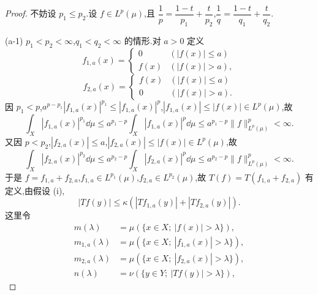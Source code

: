 \begin{proof}
不妨设 $p_{1} \leq p_{2}$.设 $f \in L^{p}(\mu)$,且 $\dfrac{1}{p} = \dfrac{1 - t}{p_{1}} + \dfrac{t}{p_{2}}$,$\dfrac{1}{q} = \dfrac{1 - t}{q_{1}} + \dfrac{t}{q_{2}}$.

(a-1) $p_{1} < p_{2} < \infty$,$q_{1} < q_{2} < \infty$ 的情形.对 $a > 0$ 定义
\begin{equation*}
f_{1,a}(x) = \begin{cases} 0 & (|f(x)| \leq a) \\ f(x) & (|f(x)| > a), \end{cases}
\end{equation*}
\begin{equation*}
f_{2,a}(x) = \begin{cases} f(x) & (|f(x)| \leq a) \\ 0 & (|f(x)| > a). \end{cases}
\end{equation*}
因 $p_{1} < p$,$a^{p-p_{1}}|f_{1,a}(x)|^{p_{1}} \leq |f_{1,a}(x)|^{p}$,$|f_{1,a}(x)| \leq |f(x)| \in L^{p}(\mu)$,故
\begin{equation}\tag{1.8.5}
\int_{X}|f_{1,a}(x)|^{p_{1}}\dd \mu \leq a^{p_{1}-p}\int_{X}|f_{1,a}(x)|^{p}\dd \mu \leq a^{p_{1}-p}\| f \|_{L^{p}(\mu)}^{p} < \infty.
\label{eq:1.8.5}\end{equation}
又因 $p < p_{2}$,$|f_{2,a}(x)| \leq a$,$|f_{2,a}(x)| \leq |f(x)| \in L^{p}(\mu)$,故
\begin{equation}\tag{1.8.6}
\int_{X}|f_{2,a}(x)|^{p_{2}}\dd \mu \leq a^{p_{2}-p}\int_{X}|f_{2,a}(x)|^{p}\dd \mu \leq a^{p_{2}-p}\| f \|_{L^{p}(\mu)}^{p} < \infty.
\label{eq:1.8.6}\end{equation}
于是 $f = f_{1,a} + f_{2,a}$,$f_{1,a} \in L^{p_{1}}(\mu)$,$f_{2,a} \in L^{p_{2}}(\mu)$,故 $T(f) = T(f_{1,a} + f_{2,a})$ 有定义,由假设 (i),
\begin{equation}\tag{1.8.7}
|Tf(y)| \leq \kappa\left(|Tf_{1,a}(y)| + |Tf_{2,a}(y)|\right).
\label{eq:1.8.7}\end{equation}
这里令
\begin{equation*}
\begin{aligned}
m(\lambda) &= \mu(\{x \in X;\ |f(x)| > \lambda\}), \\
m_{1,a}(\lambda) &= \mu(\{x \in X;\ |f_{1,a}(x)| > \lambda\}), \\
m_{2,a}(\lambda) &= \mu(\{x \in X;\ |f_{2,a}(x)| > \lambda\}), \\
n(\lambda) &= \nu(\{y \in Y;\ |Tf(y)| > \lambda\}),
\end{aligned}
\end{equation*}

\end{proof}
